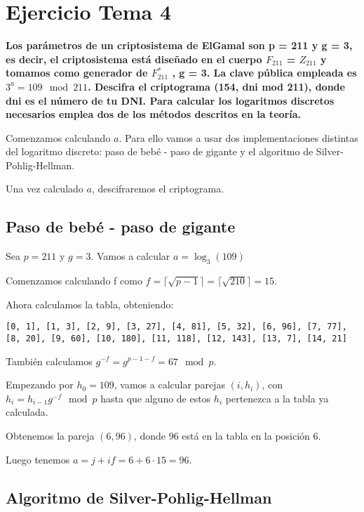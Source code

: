 \documentclass[a4paper]{article}
\title {\fbox{\Huge{\textbf{Ejercicio Tema 4}}}}
\author {\fbox{Ana Buendía Ruiz-Azuaga}}
\begin{document}
\maketitle


\section{Ejercicio Tema 4}

\textbf{Los parámetros de un criptosistema de ElGamal son p = 211 y g = 3, es decir, el criptosistema está diseñado en el cuerpo $F_{211}$ = $Z_{211}$ y tomamos como generador de $F^*_{211}$ , g = 3. La clave pública empleada es $3^a = 109 \mod 211$. Descifra el criptograma (154, dni mod 211), donde dni es el número de tu DNI. Para calcular los logaritmos discretos necesarios emplea dos de los métodos descritos en la teoría.}

Comenzamos calculando $a$. Para ello vamos a usar dos implementaciones distintas del logaritmo discreto: paso de bebé - paso de gigante y el algoritmo de Silver-Pohlig-Hellman.

Una vez calculado $a$, descifraremos el criptograma.

\subsection{Paso de bebé - paso de gigante}

Sea $p=211$ y $g=3$. Vamos a calcular $a=\log_3 (109)$

Comenzamos calculando f como $f=\lceil\sqrt{p-1}\rceil=\lceil\sqrt{210}\rceil=15$.

Ahora calculamos la tabla, obteniendo:

\begin{verbatim}
[0, 1], [1, 3], [2, 9], [3, 27], [4, 81], [5, 32], [6, 96], [7, 77], 
[8, 20], [9, 60], [10, 180], [11, 118], [12, 143], [13, 7], [14, 21]
\end{verbatim}

También calculamos $g^{-f}=g^{p-1-f}=67 \mod p$.

Empezando por $h_0=109$, vamos a calcular parejas $(i,h_i)$, con $h_i=h_{i-1}g^{-f}\mod p$ hasta que alguno de estos $h_i$ pertenezca a la tabla ya calculada.

Obtenemos la pareja $(6,96)$, donde $96$ está en la tabla en la posición $6$.

Luego tenemos $a=j+if=6+6\cdot 15=96$.

\subsection{Algoritmo de Silver-Pohlig-Hellman}
\end{document}

